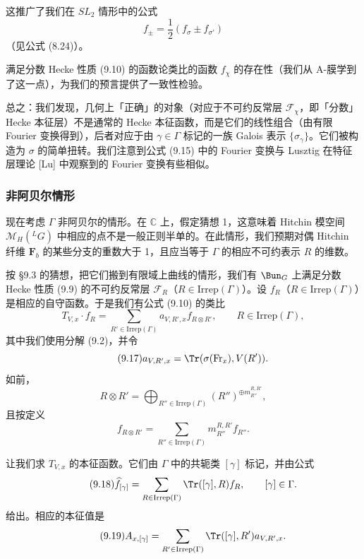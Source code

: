 
这推广了我们在 $SL_2$ 情形中的公式
\[
f_\pm = \frac{1}{2}(f_\sigma\pm f_{\sigma'})
\]
（见公式 (8.24)）。

满足分数 Hecke 性质 (9.10) 的函数论类比的函数 $f_\chi$ 的存在性（我们从 A-膜学到了这一点），为我们的预言提供了一致性检验。

总之：我们发现，几何上「正确」的对象（对应于不可约反常层 $\mathcal{F}_\chi$，即「分数」Hecke 本征层）不是通常的 Hecke 本征函数，而是它们的线性组合（由有限 Fourier 变换得到），后者对应于由 $\gamma\in\Gamma$ 标记的一族 Galois 表示 $\{\sigma_\gamma\}$。它们被构造为 $\sigma$ 的简单扭转。我们注意到公式 (9.15) 中的 Fourier 变换与 Lusztig 在特征层理论 [Lu] 中观察到的 Fourier 变换有些相似。

\subsubsection{非阿贝尔情形}

现在考虑 $\Gamma$ 非阿贝尔的情形。在 $\mathbb{C}$ 上，假定猜想 1，这意味着 Hitchin 模空间 $\mathcal{M}_H({}^{L}G)$ 中相应的点不是一般正则半单的。在此情形，我们预期对偶 Hitchin 纤维 $\boldsymbol{F}_b$ 的某些分支的重数大于 1，且应当等于 $\Gamma$ 的相应不可约表示 $R$ 的维数。

按 §9.3 的猜想，把它们搬到有限域上曲线的情形，我们有 $\Bun_G$ 上满足分数 Hecke 性质 (9.9) 的不可约反常层 $\mathcal{F}_R$（$R\in\mathrm{Irrep}(\Gamma)$）。设 $f_R$（$R\in\mathrm{Irrep}(\Gamma)$）是相应的自守函数。于是我们有公式 (9.10) 的类比
\begin{equation}\tag{9.16}
T_{V,x}\cdot f_R = \sum_{R'\in\mathrm{Irrep}(\Gamma)}a_{V,R',x}f_{R\otimes R'},
\qquad R\in\mathrm{Irrep}(\Gamma),
\end{equation}
其中我们使用分解 (9.2)，并令
\begin{equation}\tag{9.17}
a_{V,R',x} = \Tr(\sigma(\mathrm{Fr}_x),V(R')).
\end{equation}
如前，
\[
R\otimes R' = \bigoplus_{R''\in\mathrm{Irrep}(\Gamma)}(R'')^{\oplus m^{R,R'}_{R''}},
\]
且按定义
\[
f_{R\otimes R'} = \sum_{R''\in\mathrm{Irrep}(\Gamma)}m^{R,R'}_{R''}f_{R''}.
\]

让我们求 $T_{V,x}$ 的本征函数。它们由 $\Gamma$ 中的共轭类 $[\gamma]$ 标记，并由公式
\begin{equation}\tag{9.18}
\widehat{f}_{[\gamma]} = \sum_{R\in\mathrm{Irrep}(\Gamma)}\Tr([\gamma],R)f_R,
\qquad [\gamma]\in\Gamma.
\end{equation}
给出。相应的本征值是
\begin{equation}\tag{9.19}
A_{x,[\gamma]} = \sum_{R'\in\mathrm{Irrep}(\Gamma)}\Tr([\gamma],R')a_{V,R',x}.
\end{equation}


